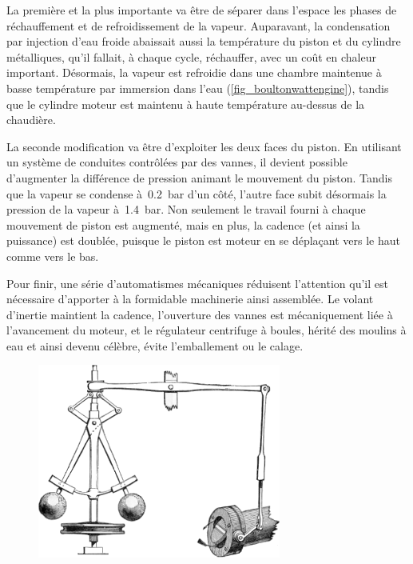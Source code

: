 	La première et la plus importante va être de séparer dans l’espace les phases de réchauffement et de refroidissement de la vapeur. Auparavant, la condensation par injection d’eau froide abaissait aussi la température du piston et du cylindre métalliques, qu’il fallait, à chaque cycle, réchauffer, avec un coût en chaleur important. Désormais, la vapeur est refroidie dans une chambre maintenue à basse température par immersion dans l’eau (\cref{fig_boultonwattengine}), tandis que le cylindre moteur est maintenu à haute température au-dessus de la chaudière.

	La seconde modification va être d’exploiter les deux faces du piston. En utilisant un système de conduites contrôlées par des vannes, il devient possible d’augmenter la différence de pression animant le mouvement du piston. Tandis que la vapeur se condense à~\SI{0,2}{\bar} d’un côté, l’autre face subit désormais la pression de la vapeur à~\SI{1,4}{\bar}. Non seulement le travail fourni à chaque mouvement de piston est augmenté, mais en plus, la cadence (et ainsi la puissance) est doublée, puisque le piston est moteur en se déplaçant vers le haut comme vers le bas.

	Pour finir, une série d’automatismes mécaniques réduisent l’attention qu’il est nécessaire d’apporter à la formidable machinerie ainsi assemblée. Le volant d’inertie maintient la cadence, l’ouverture des vannes est mécaniquement liée à l’avancement du moteur, et le régulateur centrifuge à boules, hérité des moulins à eau et ainsi devenu célèbre, évite l’emballement ou le calage.

	\begin{figure}
	\begin{center}
		\includegraphics[width=8cm]{images/centrifugal_governor.png}
	\end{center}
	\end{figure}

